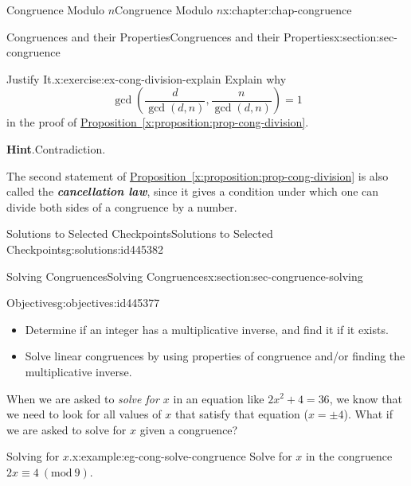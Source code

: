 \documentclass[oneside,10pt,]{book}
\newcommand{\blocktitlefont}{\relax}
\newcommand{\xreffont}{\relax}
\newcommand{\alert}[1]{\textbf{\textit{#1}}}
\numberwithin{equation}{section}
\newcommand{\Mod}[1]{\ \left(\mathrm{mod}\ #1\right)}
\begin{document}
\begin{chapterptx}{Congruence Modulo \(n\)}{}{Congruence Modulo \(n\)}{}{}{x:chapter:chap-congruence}
\begin{sectionptx}{Congruences and their Properties}{}{Congruences and their Properties}{}{}{x:section:sec-congruence}
\begin{inlineexercise}{Justify It.}{x:exercise:ex-cong-division-explain}
Explain why%
\begin{equation*}
\gcd\left(\dfrac{d}{\gcd(d,n)},\dfrac{n}{\gcd(d,n)}\right) = 1
\end{equation*}
in the proof of \hyperref[x:proposition:prop-cong-division]{Proposition~{\xreffont\ref{x:proposition:prop-cong-division}}}.%
\par\smallskip%
\noindent\textbf{\blocktitlefont Hint}.\hypertarget{g:hint:id445384}{}\quad{}Contradiction.%
\end{inlineexercise}
The second statement of \hyperref[x:proposition:prop-cong-division]{Proposition~{\xreffont\ref{x:proposition:prop-cong-division}}} is also called the \alert{cancellation law}, since it gives a condition under which one can divide both sides of a congruence by a number.%
%
%
\typeout{************************************************}
\typeout{************************************************}
%
\begin{solutions-subsection}{Solutions to Selected Checkpoints}{}{Solutions to Selected Checkpoints}{}{}{g:solutions:id445382}
\end{solutions-subsection}
\end{sectionptx}
%
%
\typeout{************************************************}
\typeout{************************************************}
%
\begin{sectionptx}{Solving Congruences}{}{Solving Congruences}{}{}{x:section:sec-congruence-solving}
\begin{objectives}{Objectives}{g:objectives:id445377}
%
\begin{itemize}[label=\textbullet]
\item{}Determine if an integer has a multiplicative inverse, and find it if it exists.%
\item{}Solve linear congruences by using properties of congruence and\slash{}or finding the multiplicative inverse.%
\end{itemize}
\end{objectives}
When we are asked to \emph{solve for \(x\)} in an equation like \(2x^2 + 4 = 36\), we know that we need to look for all values of \(x\) that satisfy that equation (\(x = \pm 4\)). What if we are asked to solve for \(x\) given a congruence?%
\begin{example}{Solving for \(x\).}{x:example:eg-cong-solve-congruence}%
Solve for \(x\) in the congruence \(2x \equiv 4 \Mod{9}\).%
\par

\end{example}
\end{sectionptx}
\end{chapterptx}
\end{document}
